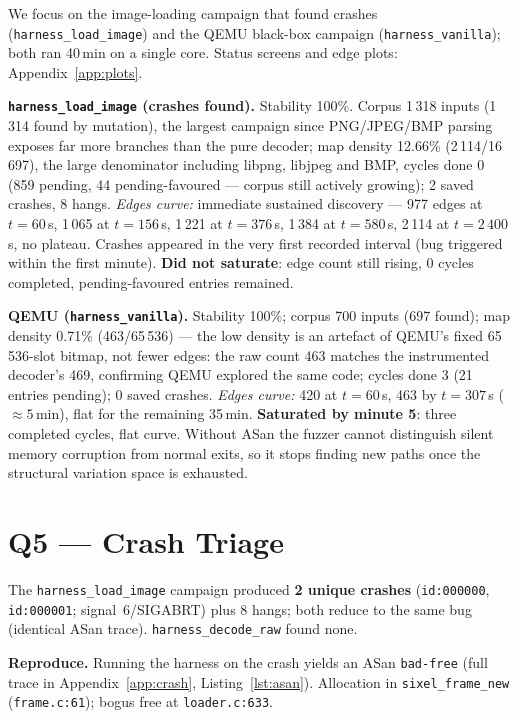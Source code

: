 \documentclass[letterpaper,twocolumn,10pt]{article}
\begin{document}
We focus on the image-loading campaign that found crashes
(\texttt{harness\_load\_image}) and the QEMU black-box campaign
(\texttt{harness\_vanilla}); both ran 40\,min on a single core. Status screens
and edge plots: Appendix~\ref{app:plots}.

\textbf{\texttt{harness\_load\_image} (crashes found).} Stability 100\%. Corpus 1\,318 inputs (1\,314 found by mutation), the largest
campaign since PNG/JPEG/BMP parsing exposes far more branches than the pure
decoder; map density 12.66\% (2\,114/16\,697), the large denominator including
libpng, libjpeg and BMP, cycles done 0 (859 pending, 44 pending-favoured ---
corpus still actively growing); 2 saved crashes, 8 hangs.
\emph{Edges curve:} immediate sustained discovery --- 977 edges at $t=60$\,s,
1\,065 at $t=156$\,s, 1\,221 at $t=376$\,s, 1\,384 at $t=580$\,s, 2\,114 at
$t=2\,400$\,s, no plateau. Crashes appeared in the very first recorded
interval (bug triggered within the first minute). \textbf{Did not saturate}:
edge count still rising, 0 cycles completed, pending-favoured entries remained.

\textbf{QEMU (\texttt{harness\_vanilla}).} Stability 100\%; corpus 700
inputs (697 found); map density 0.71\% (463/65\,536) --- the low density is an
artefact of QEMU's fixed 65\,536-slot bitmap, not fewer edges: the raw count
463 matches the instrumented decoder's 469, confirming QEMU explored the same
code; cycles done 3 (21 entries pending); 0 saved crashes.
\emph{Edges curve:} 420 at $t=60$\,s, 463 by $t=307$\,s ($\approx 5$\,min),
flat for the remaining 35\,min. \textbf{Saturated by minute 5}: three completed
cycles, flat curve. Without ASan the fuzzer cannot distinguish silent memory
corruption from normal exits, so it stops finding new paths once the
structural variation space is exhausted.

\section{Q5 --- Crash Triage}

The \texttt{harness\_load\_image} campaign produced \textbf{2 unique crashes}
(\texttt{id:000000}, \texttt{id:000001}; signal~6/SIGABRT) plus 8 hangs; both
reduce to the same bug (identical ASan trace). \texttt{harness\_decode\_raw}
found none.

\textbf{Reproduce.} Running the harness on the crash yields an ASan
\texttt{bad-free} (full trace in Appendix~\ref{app:crash},
Listing~\ref{lst:asan}). Allocation in \texttt{sixel\_frame\_new}
(\texttt{frame.c:61}); bogus free at \texttt{loader.c:633}.
\end{document}
